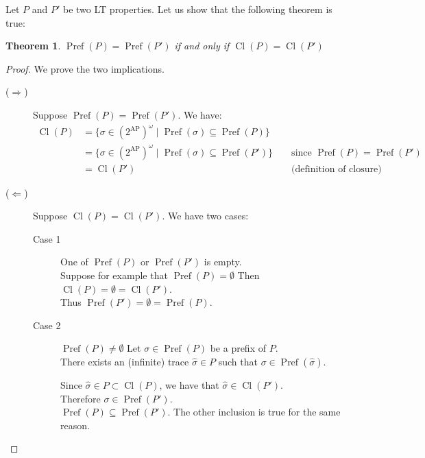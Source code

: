 \documentclass[11pt,a4paper]{article}
\newtheorem*{theorem}{Theorem}
\DeclareMathOperator{\Pref}{Pref}
\DeclareMathOperator{\Cl}{Cl}
\begin{document}
\begin{Answer}

  Let $P$ and $P'$ be two LT properties. Let us show that the following theorem is true:
  \begin{theorem}
    $\Pref(P) = \Pref(P')$ if and only if $\Cl(P) = \Cl(P')$
  \end{theorem}
  \begin{proof}
    We prove the two implications.
    \begin{description}
      \item[($\Rightarrow$)]
        Suppose $\Pref(P) = \Pref(P')$. We have:
        \begin{align*}
          \Cl(P) &= \{\sigma\in{(2^{\textrm{AP}})}^\omega \mid \Pref(\sigma)\subseteq\Pref(P)\}\\
          &= \{\sigma\in{(2^{\textrm{AP}})}^\omega \mid \Pref(\sigma)\subseteq\Pref(P')\} &&\text{ since }\Pref(P) = \Pref(P')\\
          &= \Cl(P')&&\text{ (definition of closure)}
        \end{align*}
      \item[($\Leftarrow$)]
        Suppose $\Cl(P) = \Cl(P')$. We have two cases:
        \begin{description}
          \item[Case 1] One of $\Pref(P)$ or $\Pref(P')$ is empty.\\
          Suppose for example that $\Pref(P) = \emptyset$ Then $\Cl(P) = \emptyset = \Cl(P')$.\\
          Thus $\Pref(P') = \emptyset = \Pref(P)$.
          \item[Case 2] $\Pref(P) \neq \emptyset$
          Let $\sigma\in\Pref(P)$ be a prefix of $P$. \\
          There exists an (infinite) trace $\hat{\sigma} \in P$ such that $\sigma\in\Pref(\hat{\sigma})$.

          Since $\hat{\sigma}\in P\subset\Cl(P)$, we have that $\hat{\sigma}\in\Cl(P')$. \\
          Therefore $\sigma\in\Pref(P')$.\\
          $\Pref(P)\subseteq\Pref(P')$. The other inclusion is true for the same reason.

        \end{description}
    \end{description}
  \end{proof}
\end{Answer}
\end{document}

